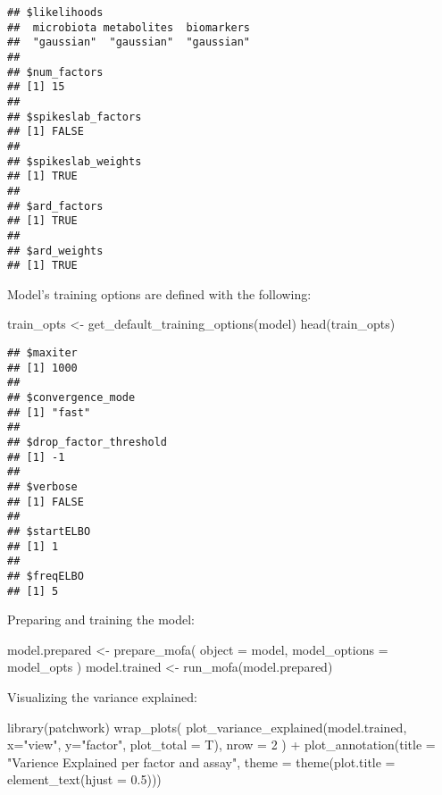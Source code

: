 \documentclass[
  oneside]{book}
\newenvironment{Shaded}{\begin{snugshade}}{\end{snugshade}}
\newcommand{\AttributeTok}[1]{\textcolor[rgb]{0.77,0.63,0.00}{#1}}
\newcommand{\DecValTok}[1]{\textcolor[rgb]{0.00,0.00,0.81}{#1}}
\newcommand{\FloatTok}[1]{\textcolor[rgb]{0.00,0.00,0.81}{#1}}
\newcommand{\FunctionTok}[1]{\textcolor[rgb]{0.00,0.00,0.00}{#1}}
\newcommand{\NormalTok}[1]{#1}
\newcommand{\OtherTok}[1]{\textcolor[rgb]{0.56,0.35,0.01}{#1}}
\newcommand{\SpecialCharTok}[1]{\textcolor[rgb]{0.00,0.00,0.00}{#1}}
\newcommand{\StringTok}[1]{\textcolor[rgb]{0.31,0.60,0.02}{#1}}
\begin{document}
\begin{verbatim}
## $likelihoods
##  microbiota metabolites  biomarkers 
##  "gaussian"  "gaussian"  "gaussian" 
## 
## $num_factors
## [1] 15
## 
## $spikeslab_factors
## [1] FALSE
## 
## $spikeslab_weights
## [1] TRUE
## 
## $ard_factors
## [1] TRUE
## 
## $ard_weights
## [1] TRUE
\end{verbatim}

Model's training options are defined with the following:

\begin{Shaded}
\begin{Highlighting}[]
\NormalTok{train\_opts }\OtherTok{\textless{}{-}} \FunctionTok{get\_default\_training\_options}\NormalTok{(model)}
\FunctionTok{head}\NormalTok{(train\_opts)}
\end{Highlighting}
\end{Shaded}

\begin{verbatim}
## $maxiter
## [1] 1000
## 
## $convergence_mode
## [1] "fast"
## 
## $drop_factor_threshold
## [1] -1
## 
## $verbose
## [1] FALSE
## 
## $startELBO
## [1] 1
## 
## $freqELBO
## [1] 5
\end{verbatim}

Preparing and training the model:

\begin{Shaded}
\begin{Highlighting}[]
\NormalTok{model.prepared }\OtherTok{\textless{}{-}} \FunctionTok{prepare\_mofa}\NormalTok{(}
  \AttributeTok{object =}\NormalTok{ model,}
  \AttributeTok{model\_options =}\NormalTok{ model\_opts}
\NormalTok{)}
\NormalTok{model.trained }\OtherTok{\textless{}{-}} \FunctionTok{run\_mofa}\NormalTok{(model.prepared)}
\end{Highlighting}
\end{Shaded}

Visualizing the variance explained:

\begin{Shaded}
\begin{Highlighting}[]
\FunctionTok{library}\NormalTok{(patchwork)}
\FunctionTok{wrap\_plots}\NormalTok{(}
    \FunctionTok{plot\_variance\_explained}\NormalTok{(model.trained, }\AttributeTok{x=}\StringTok{"view"}\NormalTok{, }\AttributeTok{y=}\StringTok{"factor"}\NormalTok{, }\AttributeTok{plot\_total =}\NormalTok{ T),}
    \AttributeTok{nrow =} \DecValTok{2}
\NormalTok{) }\SpecialCharTok{+} \FunctionTok{plot\_annotation}\NormalTok{(}\AttributeTok{title =} \StringTok{"Varience Explained per factor and assay"}\NormalTok{,}
                    \AttributeTok{theme =} \FunctionTok{theme}\NormalTok{(}\AttributeTok{plot.title =} \FunctionTok{element\_text}\NormalTok{(}\AttributeTok{hjust =} \FloatTok{0.5}\NormalTok{)))}
\end{Highlighting}
\end{Shaded}
\end{document}
